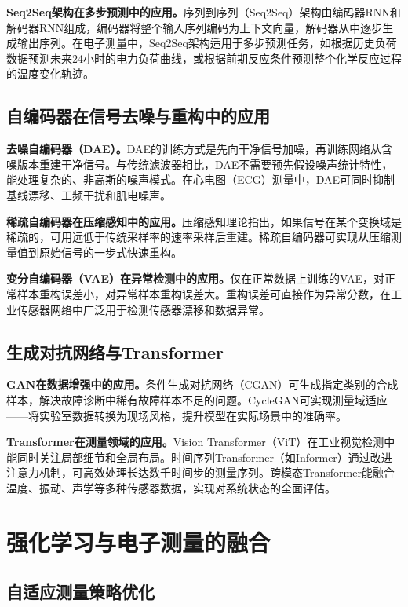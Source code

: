 \documentclass[12pt,a4paper]{article}
\numberwithin{figure}{section}
\numberwithin{table}{section}
\numberwithin{equation}{section}
\begin{document}
\textbf{Seq2Seq架构在多步预测中的应用。}序列到序列（Seq2Seq）架构由编码器RNN和解码器RNN组成，编码器将整个输入序列编码为上下文向量，解码器从中逐步生成输出序列。在电子测量中，Seq2Seq架构适用于多步预测任务，如根据历史负荷数据预测未来24小时的电力负荷曲线，或根据前期反应条件预测整个化学反应过程的温度变化轨迹。

\subsection{自编码器在信号去噪与重构中的应用}

\textbf{去噪自编码器（DAE）。}DAE的训练方式是先向干净信号加噪，再训练网络从含噪版本重建干净信号。与传统滤波器相比，DAE不需要预先假设噪声统计特性，能处理复杂的、非高斯的噪声模式。在心电图（ECG）测量中，DAE可同时抑制基线漂移、工频干扰和肌电噪声。

\textbf{稀疏自编码器在压缩感知中的应用。}压缩感知理论指出，如果信号在某个变换域是稀疏的，可用远低于传统采样率的速率采样后重建。稀疏自编码器可实现从压缩测量值到原始信号的一步式快速重构。

\textbf{变分自编码器（VAE）在异常检测中的应用。}仅在正常数据上训练的VAE，对正常样本重构误差小，对异常样本重构误差大。重构误差可直接作为异常分数，在工业传感器网络中广泛用于检测传感器漂移和数据异常。

\subsection{生成对抗网络与Transformer}

\textbf{GAN在数据增强中的应用。}条件生成对抗网络（CGAN）可生成指定类别的合成样本，解决故障诊断中稀有故障样本不足的问题。CycleGAN可实现测量域适应——将实验室数据转换为现场风格，提升模型在实际场景中的准确率。

\textbf{Transformer在测量领域的应用。}Vision Transformer（ViT）在工业视觉检测中能同时关注局部细节和全局布局。时间序列Transformer（如Informer）通过改进注意力机制，可高效处理长达数千时间步的测量序列。跨模态Transformer能融合温度、振动、声学等多种传感器数据，实现对系统状态的全面评估。

\newpage

\section{强化学习与电子测量的融合}

\subsection{自适应测量策略优化}
\end{document}
